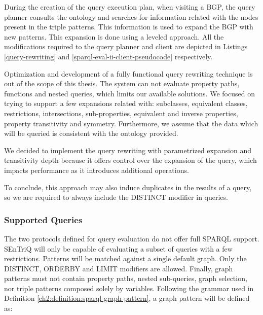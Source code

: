 %

During the creation of the query execution plan, when visiting a \gls{BGP}, the query planner consults the ontology and searches for information related with the nodes present in the triple patterns. This information is used to expand the \gls{BGP} with new patterns. This expansion is done using a leveled approach. All the modifications required to the query planner and client are depicted in Listings \ref{query-rewriting} and \ref{sparql-eval-ii-client-pseudocode} respectively.

%

%

Optimization and development of a fully functional query rewriting technique is out of the scope of this thesis. The system can not evaluate property paths, functions and nested queries, which limits our available solutions. We focused on trying to support a few expansions related with: subclasses, equivalent classes, restrictions, intersections, sub-properties, equivalent and inverse properties, property transitivity and symmetry. Furthermore, we assume that the data which will be queried is consistent with the ontology provided.

We decided to implement the query rewriting with parametrized expansion and transitivity depth because it offers control over the expansion of the query, which impacts performance as it introduces additional operations.

To conclude, this approach may also induce duplicates in the results of a query, so we are required to always include the DISTINCT modifier in queries.

\subsubsection{Supported Queries}

The two protocols defined for query evaluation do not offer full \gls{SPARQL} support. \gls{SEnTriQ} will only be capable of evaluating a subset of queries with a few restrictions. Patterns will be matched against a single default graph. Only the DISTINCT, ORDERBY and LIMIT modifiers are allowed. Finally, graph patterns must not contain property paths, nested sub-queries, graph selection, nor triple patterns composed solely by variables. Following the grammar used in Definition \ref{ch2:definition:sparql-graph-pattern}, a graph pattern will be defined as:

